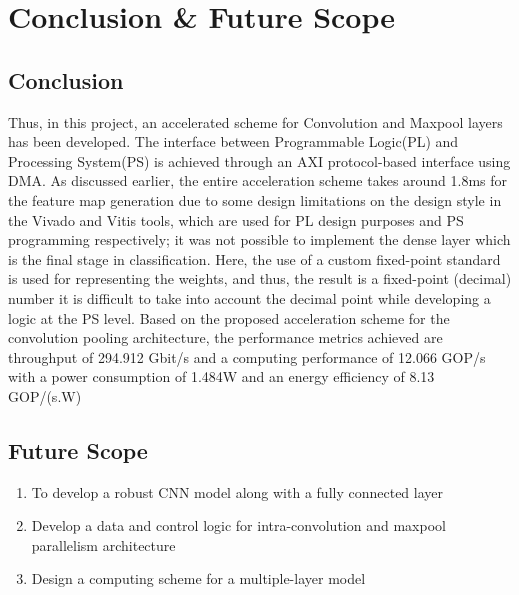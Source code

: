 \setlength{\parindent}{2em}
\chapter{Conclusion \& Future Scope}
    \section{Conclusion}
    \noindent
    Thus, in this project, an accelerated scheme for Convolution and Maxpool layers has been developed. The interface between Programmable Logic(PL) and Processing System(PS) is achieved through an AXI protocol-based interface using DMA. As discussed earlier, the entire acceleration scheme takes around 1.8ms for the feature map generation due to some design limitations on the design style in the Vivado and Vitis tools, which are used for PL design purposes and PS programming respectively; it was not possible to implement the dense layer which is the final stage in classification. Here, the use of a custom fixed-point standard is used for representing the weights, and thus, the result is a fixed-point (decimal) number it is difficult to take into account the decimal point while developing a logic at the PS level. Based on the proposed acceleration scheme for the convolution pooling architecture, the performance metrics achieved are throughput of 294.912 Gbit/s and a computing performance of 12.066 GOP/s with a power consumption of 1.484W and an energy efficiency of 8.13 GOP/(s.W)

    \section{Future Scope}
    \begin{enumerate}
        \item To develop a robust CNN model along with a fully connected layer 
        \item Develop a data and control logic for intra-convolution and maxpool parallelism architecture
        \item Design a computing scheme for a multiple-layer model 
    \end{enumerate}
    
